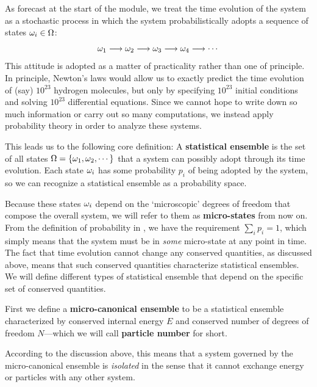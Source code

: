 As forecast at the start of the module, we treat the time evolution of the system as a stochastic process in which the system probabilistically adopts a sequence of states $\omega_i \in \Omega$:
\begin{equation*}
  \omega_1 \longrightarrow \omega_2 \longrightarrow \omega_3 \longrightarrow \omega_4 \longrightarrow \cdots
\end{equation*}
This attitude is adopted as a matter of practicality rather than one of principle.
In principle, Newton's laws would allow us to exactly predict the time evolution of (say) $10^{23}$ hydrogen molecules, but only by specifying $10^{23}$ initial conditions and solving $10^{23}$ differential equations.
Since we cannot hope to write down so much information or carry out so many computations, we instead apply probability theory in order to analyze these systems.

\begin{shaded}
  This leads us to the following core definition: A \textbf{statistical ensemble} is the set of all states $\Omega = \left\{\omega_1, \omega_2, \cdots\right\}$ that a system can possibly adopt through its time evolution.
  Each state $\omega_i$ has some probability $p_i$ of being adopted by the system, so we can recognize a statistical ensemble as a probability space.
\end{shaded}

Because these states $\omega_i$ depend on the `microscopic' degrees of freedom that compose the overall system, we will refer to them as \textbf{micro-states} from now on.
From the definition of probability in , we have the requirement $\sum_i p_i = 1$, which simply means that the system must be in \textit{some} micro-state at any point in time.
The fact that time evolution cannot change any conserved quantities, as discussed above, means that such conserved quantities characterize statistical ensembles.
We will define different types of statistical ensemble that depend on the specific set of conserved quantities.

\begin{shaded}
  First we define a \textbf{micro-canonical ensemble} to be a statistical ensemble characterized by conserved internal energy $E$ and conserved number of degrees of freedom $N$---which we will call \textbf{particle number} for short.
\end{shaded}

According to the discussion above, this means that a system governed by the micro-canonical ensemble is \textit{isolated} in the sense that it cannot exchange energy or particles with any other system.

